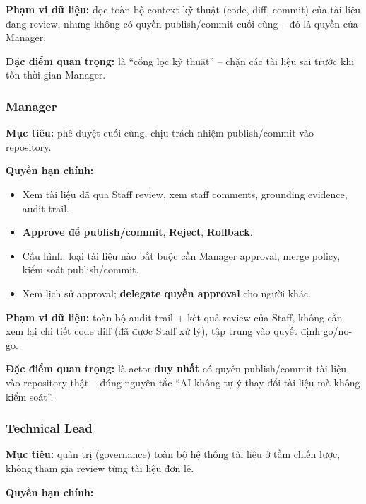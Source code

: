 \textbf{Phạm vi dữ liệu:} đọc toàn bộ context kỹ thuật
(code, diff, commit) của tài liệu đang review, nhưng không có quyền
publish/commit cuối cùng -- đó là quyền của Manager.

\textbf{Đặc điểm quan trọng:} là ``cổng lọc kỹ thuật'' -- chặn các tài liệu
sai trước khi tốn thời gian Manager.


\subsubsection{Manager}

\textbf{Mục tiêu:} phê duyệt cuối cùng, chịu trách nhiệm publish/commit
vào repository.

\textbf{Quyền hạn chính:}

\begin{itemize}
    \item Xem tài liệu đã qua Staff review, xem staff comments,
    grounding evidence, audit trail.

    \item \textbf{Approve để publish/commit}, \textbf{Reject},
    \textbf{Rollback}.

    \item Cấu hình: loại tài liệu nào bắt buộc cần Manager approval,
    merge policy, kiểm soát publish/commit.

    \item Xem lịch sử approval; \textbf{delegate quyền approval}
    cho người khác.
\end{itemize}

\textbf{Phạm vi dữ liệu:} toàn bộ audit trail + kết quả review của Staff,
không cần xem lại chi tiết code diff (đã được Staff xử lý), tập trung vào
quyết định go/no-go.

\textbf{Đặc điểm quan trọng:} là actor \textbf{duy nhất} có quyền
publish/commit tài liệu vào repository thật -- đúng nguyên tắc
``AI không tự ý thay đổi tài liệu mà không kiểm soát''.


\subsubsection{Technical Lead}

\textbf{Mục tiêu:} quản trị (governance) toàn bộ hệ thống tài liệu ở tầm
chiến lược, không tham gia review từng tài liệu đơn lẻ.

\textbf{Quyền hạn chính:}

